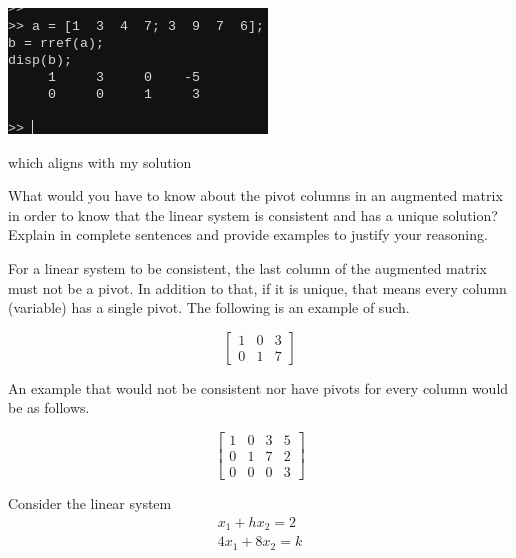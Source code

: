 \documentclass[12pt,letterpaper, onecolumn]{exam}
\begin{document}
\begin{questions}
\begin{solution}
\begin{center}
\begin{center}
                    \includegraphics{matlab-verify}
                \end{center}
                which aligns with my solution
            \end{center}
        \end{solution}
    \pagebreak

    \question What would you have to know about the pivot columns in an augmented
        matrix in order to know that the linear system is consistent and has a
        unique solution? Explain in complete sentences and provide examples to
        justify your reasoning.
    
        \begin{solution}
            For a linear system to be consistent, the last column of the augmented matrix must not be a pivot. In addition to that, if it is unique, that means every column (variable) has a single pivot. The following is an example of such.

            $$
            \begin{bmatrix}
                1 & 0 & 3\\
                0 & 1 & 7
            \end{bmatrix}
            $$

            An example that would not be consistent nor have pivots for every column would be as follows.
            
            $$
            \begin{bmatrix}
                1 & 0 & 3 & 5\\
                0 & 1 & 7 & 2\\
                0 & 0 & 0 & 3
            \end{bmatrix}
            $$
        \end{solution}
    \pagebreak

    \question Consider the linear system\\
            $$
            \begin{matrix}
                x_1 + hx_2 = 2\\
                4x_1 + 8x_2 = k
            \end{matrix}
            $$
            \begin{parts}

\end{parts}
\end{questions}
\end{document}
